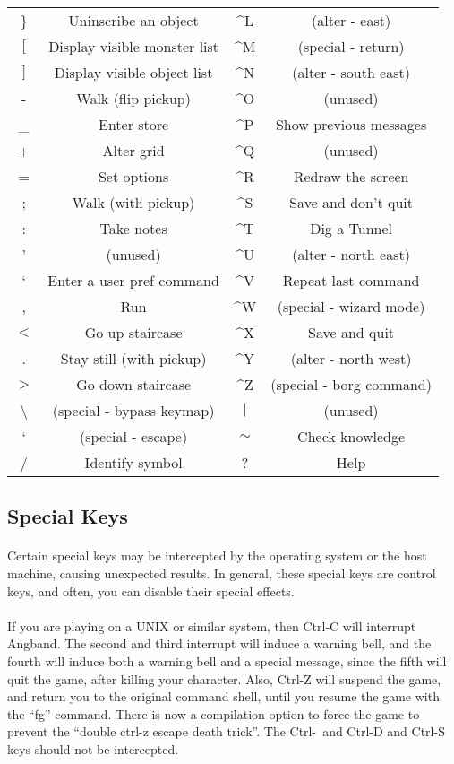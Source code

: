 \begin{tabular}{cc|cc}
\} & Uninscribe an object & \^{}L & (alter - east)\\
$[$ & Display visible monster list & \^{}M & (special - return)\\
$]$ & Display visible object list & \^{}N & (alter - south east)\\
- & Walk (flip pickup) & \^{}O & (unused)\\
\_ & Enter store & \^{}P & Show previous messages\\
+ & Alter grid & \^{}Q & (unused)\\
= & Set options & \^{}R & Redraw the screen\\
; & Walk (with pickup) & \^{}S & Save and don't quit\\
: & Take notes & \^{}T & Dig a Tunnel\\
' & (unused) & \^{}U & (alter - north east)\\
` &  Enter a user pref command & \^{}V & Repeat last command\\
, & Run & \^{}W & (special - wizard mode)\\
$<$ & Go up staircase & \^{}X & Save and quit\\
. & Stay still (with pickup) & \^{}Y & (alter - north west)\\
$>$ & Go down staircase & \^{}Z & (special - borg command)\\
\textbackslash & (special - bypass keymap) & $|$ & (unused)\\
` & (special - escape) & $\sim$ & Check knowledge\\
/ & Identify symbol & ? & Help\\
\end{tabular}

\subsection{Special Keys}
\paragraph{}Certain special keys may be intercepted by the operating system or
the host machine, causing unexpected results. In general, these special keys
are control keys, and often, you can disable their special effects.

\paragraph{}If you are playing on a UNIX or similar system, then Ctrl-C will
interrupt Angband. The second and third interrupt will induce a warning
bell, and the fourth will induce both a warning bell and a special message,
since the fifth will quit the game, after killing your character. Also,
Ctrl-Z will suspend the game, and return you to the original command shell,
until you resume the game with the ``fg'' command. There is now a compilation
option to force the game to prevent the ``double ctrl-z escape death
trick''.
The Ctrl-\ and Ctrl-D and Ctrl-S keys should not be intercepted.
 
